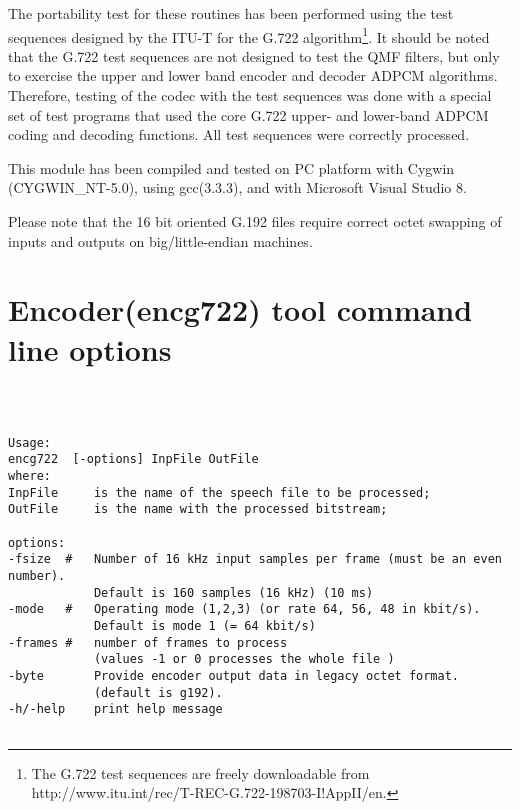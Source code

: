 The portability test for these routines has been performed using the
test sequences designed by the ITU-T for the G.722 algorithm\footnote{
  The G.722 test sequences are freely downloadable from
  http://www.itu.int/rec/T-REC-G.722-198703-I!AppII/en.}. It should be
noted that the G.722 test sequences are not designed to test the QMF
filters, but only to exercise the upper and lower band encoder and
decoder ADPCM algorithms. Therefore, testing of the codec with the
test sequences was done with a special set of test programs that used
the core G.722 upper- and lower-band ADPCM coding and decoding
functions. All test sequences were correctly processed.

This module has been compiled and tested on PC platform with Cygwin (CYGWIN\_NT-5.0), using gcc(3.3.3), and with Microsoft Visual Studio 8. 

Please note that the 16 bit oriented G.192 files require correct octet
swapping of inputs and outputs on big/little-endian machines.

\section{Encoder(encg722) tool command line options}

{\tt\small
\begin{verbatim}

Usage:
encg722  [-options] InpFile OutFile  
where:
InpFile     is the name of the speech file to be processed;
OutFile     is the name with the processed bitstream;

options:
-fsize  #   Number of 16 kHz input samples per frame (must be an even number).
            Default is 160 samples (16 kHz) (10 ms)  
-mode   #   Operating mode (1,2,3) (or rate 64, 56, 48 in kbit/s). 
            Default is mode 1 (= 64 kbit/s)
-frames #   number of frames to process
            (values -1 or 0 processes the whole file )
-byte       Provide encoder output data in legacy octet format.
            (default is g192). 			   
-h/-help    print help message


\end{verbatim}
}

